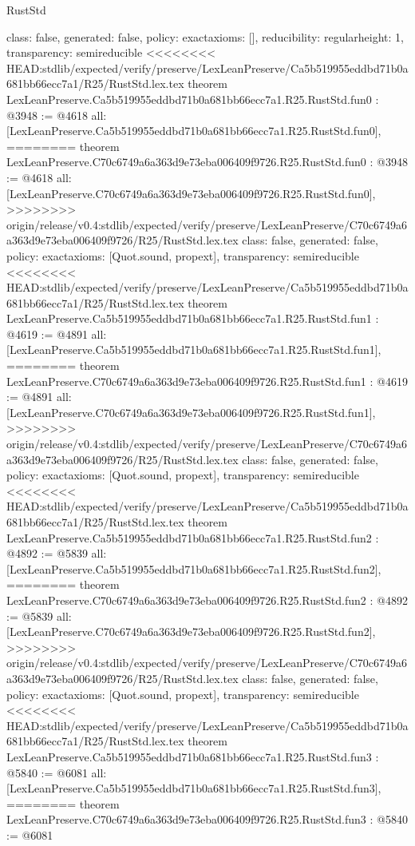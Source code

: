 \begin{lexlean}{RustStd}
\begin{coremodule}
{\begin{coremodule}
{{{  class: false,
  generated: false,
  policy: exact{axioms: []},
  reducibility: regular{height: 1},
  transparency: semireducible
}
<<<<<<<< HEAD:stdlib/expected/verify/preserve/LexLeanPreserve/Ca5b519955eddbd71b0a681bb66ecc7a1/R25/RustStd.lex.tex
theorem LexLeanPreserve.Ca5b519955eddbd71b0a681bb66ecc7a1.R25.RustStd.fun0 : @3948 := @4618 {
  all: [LexLeanPreserve.Ca5b519955eddbd71b0a681bb66ecc7a1.R25.RustStd.fun0],
========
theorem LexLeanPreserve.C70c6749a6a363d9e73eba006409f9726.R25.RustStd.fun0 : @3948 := @4618 {
  all: [LexLeanPreserve.C70c6749a6a363d9e73eba006409f9726.R25.RustStd.fun0],
>>>>>>>> origin/release/v0.4:stdlib/expected/verify/preserve/LexLeanPreserve/C70c6749a6a363d9e73eba006409f9726/R25/RustStd.lex.tex
  class: false,
  generated: false,
  policy: exact{axioms: [Quot.sound, propext]},
  transparency: semireducible
}
<<<<<<<< HEAD:stdlib/expected/verify/preserve/LexLeanPreserve/Ca5b519955eddbd71b0a681bb66ecc7a1/R25/RustStd.lex.tex
theorem LexLeanPreserve.Ca5b519955eddbd71b0a681bb66ecc7a1.R25.RustStd.fun1 : @4619 := @4891 {
  all: [LexLeanPreserve.Ca5b519955eddbd71b0a681bb66ecc7a1.R25.RustStd.fun1],
========
theorem LexLeanPreserve.C70c6749a6a363d9e73eba006409f9726.R25.RustStd.fun1 : @4619 := @4891 {
  all: [LexLeanPreserve.C70c6749a6a363d9e73eba006409f9726.R25.RustStd.fun1],
>>>>>>>> origin/release/v0.4:stdlib/expected/verify/preserve/LexLeanPreserve/C70c6749a6a363d9e73eba006409f9726/R25/RustStd.lex.tex
  class: false,
  generated: false,
  policy: exact{axioms: [Quot.sound, propext]},
  transparency: semireducible
}
<<<<<<<< HEAD:stdlib/expected/verify/preserve/LexLeanPreserve/Ca5b519955eddbd71b0a681bb66ecc7a1/R25/RustStd.lex.tex
theorem LexLeanPreserve.Ca5b519955eddbd71b0a681bb66ecc7a1.R25.RustStd.fun2 : @4892 := @5839 {
  all: [LexLeanPreserve.Ca5b519955eddbd71b0a681bb66ecc7a1.R25.RustStd.fun2],
========
theorem LexLeanPreserve.C70c6749a6a363d9e73eba006409f9726.R25.RustStd.fun2 : @4892 := @5839 {
  all: [LexLeanPreserve.C70c6749a6a363d9e73eba006409f9726.R25.RustStd.fun2],
>>>>>>>> origin/release/v0.4:stdlib/expected/verify/preserve/LexLeanPreserve/C70c6749a6a363d9e73eba006409f9726/R25/RustStd.lex.tex
  class: false,
  generated: false,
  policy: exact{axioms: [Quot.sound, propext]},
  transparency: semireducible
}
<<<<<<<< HEAD:stdlib/expected/verify/preserve/LexLeanPreserve/Ca5b519955eddbd71b0a681bb66ecc7a1/R25/RustStd.lex.tex
theorem LexLeanPreserve.Ca5b519955eddbd71b0a681bb66ecc7a1.R25.RustStd.fun3 : @5840 := @6081 {
  all: [LexLeanPreserve.Ca5b519955eddbd71b0a681bb66ecc7a1.R25.RustStd.fun3],
========
theorem LexLeanPreserve.C70c6749a6a363d9e73eba006409f9726.R25.RustStd.fun3 : @5840 := @6081 {
}}}}}}}
\end{coremodule}}
\end{coremodule}
\end{lexlean}
